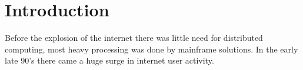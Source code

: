 \section{Introduction}
  
   Before the explosion of the internet there was little need for distributed computing, most heavy processing was done by mainframe solutions. In the early late 90's there came a huge surge in internet user activity.